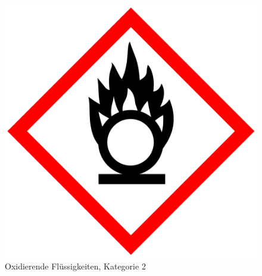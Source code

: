 \begin{figure}[h]
    \begin{center}
        \begin{minipage}[t]{0.4\textwidth}
            \begin{center}
                \includegraphics[height=0.1\textheight]{Bilder/Optische_Datentraeger_Die_Compact_Disc/Material_Polycarbonat/cdbrandfoerdernd.png}
                \caption[Oxidierende Flüssigkeiten, Kategorie 2 \newline \url{https://upload.wikimedia.org/wikipedia/commons/e/e5/GHS-pictogram-rondflam.svg} (zuletzt aufgerufen am 19.09.2015)]{Oxidierende Flüssigkeiten, Kategorie 2}
                \label{fig:cdbrandfoerdernd}
            \end{center}
        \end{minipage}
        \hspace{0.025\textwidth}
        \begin{minipage}[t]{0.4\textwidth}
            \begin{center}

\end{center}
\end{minipage}
\end{center}
\end{figure}

